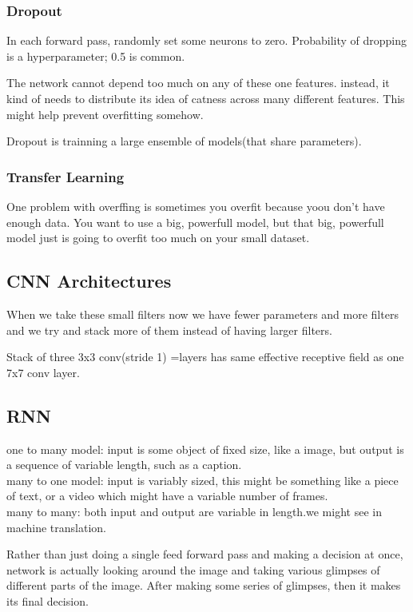 \documentclass{article}
\begin{document}
\subsubsection{Dropout}
In each forward pass, randomly set some neurons to zero. Probability of dropping is a hyperparameter; 0.5 is common.

The network cannot depend too much on any of these one features. instead,  it kind of needs to distribute its idea of catness across many different features. This might help prevent overfitting somehow.

Dropout is trainning a large ensemble of models(that share parameters).
\subsubsection{Transfer Learning}
One problem with overffing is sometimes you overfit because yoou don't have enough data. You want to use a big, powerfull model, but that big, powerfull model just is going to overfit too much on your small dataset.

\subsection{CNN Architectures}
When we take these small filters now we have fewer parameters and more filters and we try and stack more of them instead of having larger filters.

Stack of three 3x3 conv(stride 1) =layers has same effective receptive field as one 7x7 conv layer.	

\subsection{RNN}
one to many model: input is some object of fixed size, like a image, but output is a sequence of variable length, such as a caption.\\
many to one model: input is variably sized, this might be something like a piece of text, or a video which might have a variable number of frames.\\
many to many: both input and output are variable in length.we might see in machine translation.
 
 Rather than just doing a single feed forward pass and making a decision at once, network is actually looking around the image and taking various glimpses of different parts of the image. After making some series of glimpses, then it makes its final decision.
 
\end{document}
